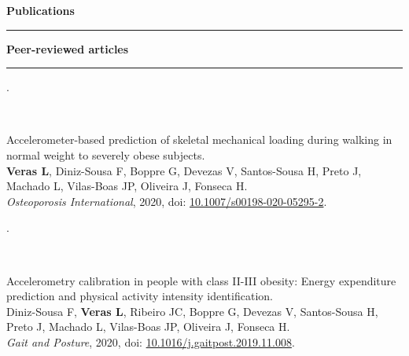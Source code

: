 \documentclass[10t]{article}
\begin{document}
\vspace{2em}


\noindent
{\large \textbf{Publications}} \\
\noindent \rule{\linewidth}{0.8pt}

\vspace{1em}

\noindent
\textbf{Peer-reviewed articles} \rule{12.9cm}{0.8pt}

\vspace{1em}

\noindent
\begin{minipage}[t]{0.15\linewidth}
	.
\end{minipage}
\
\begin{minipage}[t]{0.85\linewidth}
\begin{minipage}[t]{\columnwidth}
	Accelerometer-based prediction of skeletal mechanical loading during walking in normal weight to severely obese subjects. \\
	\textbf{Veras L}, Diniz-Sousa F, Boppre G, Devezas V, Santos-Sousa H, Preto J, Machado L, Vilas-Boas JP, Oliveira J, Fonseca H.  \\
	\textit{Osteoporosis International}, 2020, doi: \href{http://dx.doi.org/10.1007/s00198-020-05295-2}{10.1007/s00198-020-05295-2}.
\end{minipage}
\end{minipage}

\vspace{0.5em}

\noindent
\begin{minipage}[t]{0.15\linewidth}
	.
\end{minipage}
\
\begin{minipage}[t]{0.85\linewidth}
\begin{minipage}[t]{\columnwidth}
	Accelerometry calibration in people with class II-III obesity: Energy expenditure prediction and physical activity intensity identification. \\
	Diniz-Sousa F, \textbf{Veras L}, Ribeiro JC, Boppre G, Devezas V, Santos-Sousa H, Preto J, Machado L, Vilas-Boas JP, Oliveira J, Fonseca H. \\
	\textit{Gait and Posture}, 2020, doi: \href{https://doi.org/10.1016/j.gaitpost.2019.11.008}{10.1016/j.gaitpost.2019.11.008}.
\end{minipage}
\end{minipage}

\vspace{2em}
\end{document}
